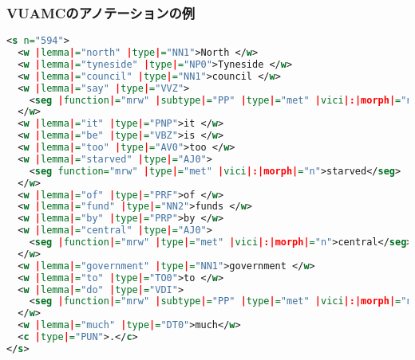 \documentclass[11pt]{beamer}
\newlength{\la}
\begin{document}
\begin{frame}[fragile]
    \frametitle{VUAMCのアノテーションの例}
\begingroup
\tiny
\begin{lstlisting}[language=XML]
<s n="594">
  <w |lemma|="north" |type|="NN1">North </w>
  <w |lemma|="tyneside" |type|="NP0">Tyneside </w>
  <w |lemma|="council" |type|="NN1">council </w>
  <w |lemma|="say" |type|="VVZ">
    <seg |function|="mrw" |subtype|="PP" |type|="met" |vici|:|morph|="n">says</seg>
  </w>
  <w |lemma|="it" |type|="PNP">it </w>
  <w |lemma|="be" |type|="VBZ">is </w>
  <w |lemma|="too" |type|="AV0">too </w>
  <w |lemma|="starved" |type|="AJ0">
    <seg function="mrw" |type|="met" |vici|:|morph|="n">starved</seg>
  </w>
  <w |lemma|="of" |type|="PRF">of </w>
  <w |lemma|="fund" |type|="NN2">funds </w>
  <w |lemma|="by" |type|="PRP">by </w>
  <w |lemma|="central" |type|="AJ0">
    <seg |function|="mrw" |type|="met" |vici|:|morph|="n">central</seg>
  </w>
  <w |lemma|="government" |type|="NN1">government </w>
  <w |lemma|="to" |type|="TO0">to </w>
  <w |lemma|="do" |type|="VDI">
    <seg |function|="mrw" |subtype|="PP" |type|="met" |vici|:|morph|="n">do</seg>
  </w>
  <w |lemma|="much" |type|="DT0">much</w>
  <c |type|="PUN">.</c>
</s>
\end{lstlisting}
\endgroup
\end{frame}
\end{document}
